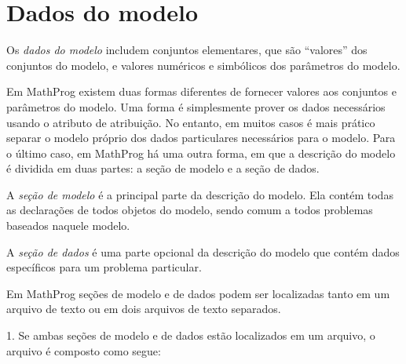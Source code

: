 \documentclass[11pt, brazil]{report}
\begin{document}

\chapter{Dados do modelo}

Os {\it dados do modelo} includem conjuntos elementares, que são ``valores'' dos
conjuntos do modelo, e valores numéricos e simbólicos dos parâmetros do modelo.

Em MathProg existem duas formas diferentes de fornecer valores aos conjuntos
e parâmetros do modelo. Uma forma é simplesmente prover os dados necessários
usando o atributo de atribuição. No entanto, em muitos casos é mais prático separar
o modelo próprio dos dados particulares necessários para o modelo. Para o último
caso, em MathProg há uma outra forma, em que a descrição do modelo é dividida
em duas partes: a seção de modelo e a seção de dados.

A {\it seção de modelo} é a principal parte da descrição do modelo. Ela contém
todas as declarações de todos objetos do modelo, sendo comum a todos problemas
baseados naquele modelo.

A {\it seção de dados} é uma parte opcional da descrição do modelo que contém
dados específicos para um problema particular.

Em MathProg seções de modelo e de dados podem ser localizadas tanto em um arquivo
de texto ou em dois arquivos de texto separados.

1. Se ambas seções de modelo e de dados estão localizados em um arquivo,
o arquivo é composto como segue:



\bigskip

\noindent\hfil
{}
\end{document}
